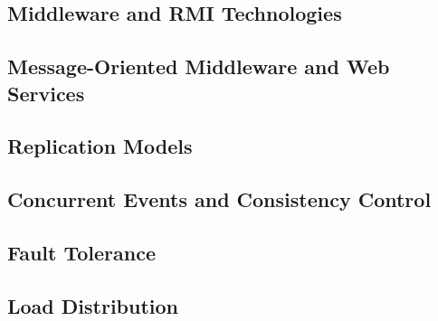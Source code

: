\subsection{Middleware and RMI Technologies}

\subsection{Message-Oriented Middleware and Web Services}

\subsection{Replication Models}

\subsection{Concurrent Events and Consistency Control}

\subsection{Fault Tolerance}

\subsection{Load Distribution}